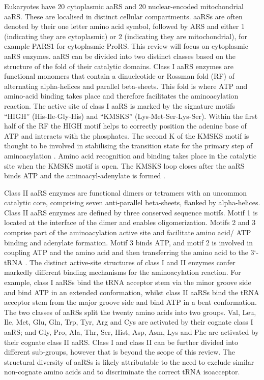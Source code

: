 Eukaryotes have 20 cytoplasmic aaRS and 20 nuclear-encoded mitochondrial aaRS.
These are localised in distinct cellular compartments.
aaRSs are often denoted by their one letter amino acid symbol, followed by ARS and either 1 (indicating they are cytoplasmic) or 2 (indicating they are mitochondrial), for example PARS1 for cytoplasmic ProRS.
This review will focus on cytoplasmic aaRS enzymes.
aaRS can be divided into two distinct classes based on the structure of the fold of their catalytic domains.
Class I aaRS enzymes are functional monomers that contain a dinucleotide or Rossman fold (RF) of alternating alpha-helices and parallel beta-sheets.
This fold is where ATP and amino-acid binding takes place and therefore facilitates the aminoacylation reaction.
The active site of class I aaRS is marked by the signature motifs ``HIGH'' (His-Ile-Gly-His) and ``KMSKS'' (Lys-Met-Ser-Lys-Ser).
Within the first half of the RF the HIGH motif helps to correctly position the adenine base of ATP and interacts with the phosphates.
The second K of the KMSKS motif is thought to be involved in stabilising the transition state for the primary step of aminoacylation \cite{newberry2002structural}.
Amino acid recognition and binding takes place in the catalytic site when the KMSKS motif is open.
The KMSKS loop closes after the aaRS binds ATP and the aminoacyl-adenylate is formed \cite{kwon2019aminoacyl}.


Class II aaRS enzymes are functional dimers or tetramers with an uncommon catalytic core, comprising seven anti-parallel beta-sheets, flanked by alpha-helices.
Class II aaRS enzymes are defined by three conserved sequence motifs.
Motif 1 is located at the interface of the dimer and enables oligomerization.
Motifs 2 and 3 comprise part of the aminoacylation active site and facilitate amino acid/ ATP binding and adenylate formation.
Motif 3 binds ATP, and motif 2 is involved in coupling ATP and the amino acid and then transferring the amino acid to the 3`-tRNA \cite{kwon2019aminoacyl}.
The distinct active-site structures of class I and II enzymes confer markedly different binding mechanisms for the aminoacylation reaction.
For example, class I aaRSs bind the tRNA acceptor stem via the minor groove side and bind ATP in an extended conformation, whilst class II aaRSs bind the tRNA acceptor stem from the major groove side and bind ATP in a bent conformation.
The two classes of aaRSs split the twenty amino acids into two groups.
Val, Leu, Ile, Met, Glu, Gln, Trp, Tyr, Arg and Cys are activated by their cognate class I aaRS; and Gly, Pro, Ala, Thr, Ser, Hist, Asp, Asm, Lys and Phe are activated by their cognate class II aaRS.
Class I and class II can be further divided into different sub-groups, however that is beyond the scope of this review.
The structural diversity of aaRSs is likely attributable to the need to exclude similar non-cognate amino acids and to discriminate the correct tRNA isoacceptor.

